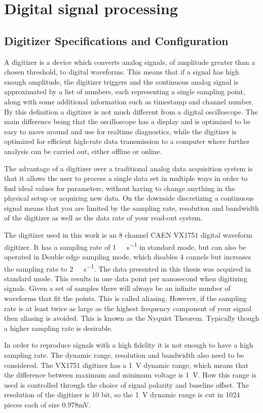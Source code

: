 \documentclass[main.tex]{subfiles}
\begin{document}
\section{Digital signal processing}
\subsection{Digitizer Specifications and Configuration}
A digitizer is a device which converts analog signals, of amplitude greater than a chosen threshold, to digital waveforms. This means that if a signal has high enough amplitude, the digitizer triggers and the continuous analog signal is approximated by a list of numbers, each representing a single sampling point, along with some additional information such as timestamp and channel number. By this definition a digitizer is not much different from a digital oscilloscope. The main difference being that the oscilloscope has a display and is optimized to be easy to move around and use for realtime diagnostics, while the digitizer is optimized for efficient high-rate data transmission to a computer where further analysis can be carried out, either offline or online.

The advantage of a digitizer over a traditional analog data acquisition system is that it allows the user to process a single data set in multiple ways in order to find ideal values for parameters, without having to change anything in the physical setup or acquiring new data. On the downside discretizing a continuous signal means that you are limited by the sampling rate, resolution and bandwidth of the digitizer as well as the data rate of your read-out system.

The digitizer used in this work is an 8 channel CAEN VX1751 digital waveform digitizer. It has a sampling rate of \si{1\giga\sample\per\second} in standard mode, but can also be operated in Double edge sampling mode, which disables 4 cannels but increases the sampling rate to \si{2\giga\sample\per\second}\cite[p.9]{CAEN}. The data presented in this thesis was acquired in standard mode. This results in one data point per nanosecond when digitizing signals. Given a set of samples there will always be an infinite number of waveforms that fit the points\cite{Spectrum}. This is called aliasing. However, if the sampling rate is at least twice as large as the highest frequency component of your signal then aliasing is avoided. This is known as the Nyquist Theorem. Typically though a higher sampling rate is desirable.

In order to reproduce signals with a high fidelity it is not enough to have a high sampling rate. The dynamic range, resolution and bandwidth also need to be considered. The VX1751 digitizer has a \si{1\volt} dynamic range, which means that the difference between maximum and minimum voltage is \si{1\volt}. How this range is used is controlled through the choice of signal polarity and baseline offset. The resolution of the digitizer is 10 bit, so the \si{1\volt} dynamic range is cut in 1024 pieces each of size 0.978\si{\milli\volt}\cite{CAEN}. 
\end{document}
